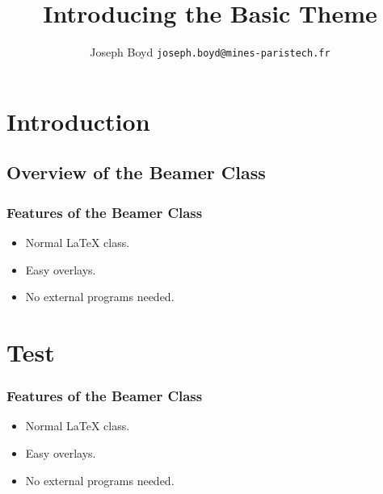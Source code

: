 \documentclass{beamer}
\title{Introducing the Basic Theme}
\author[Joseph Boyd]{Joseph Boyd \texttt{joseph.boyd@mines-paristech.fr}}
\begin{document}
\frame{\titlepage}


\section{Introduction}
\subsection{Overview of the Beamer Class}
\frame
{
  \frametitle{Features of the Beamer Class}

  \begin{itemize}
  \item<1-> Normal LaTeX class.
  \item<2-> Easy overlays.
  \item<3-> No external programs needed.      
  \end{itemize}
}

\section{Test}

\frame
{
  \frametitle{Features of the Beamer Class}

  \begin{itemize}
  \item<1-> Normal LaTeX class.
  \item<2-> Easy overlays.
  \item<3-> No external programs needed.      
  \end{itemize}
}
\end{document}
